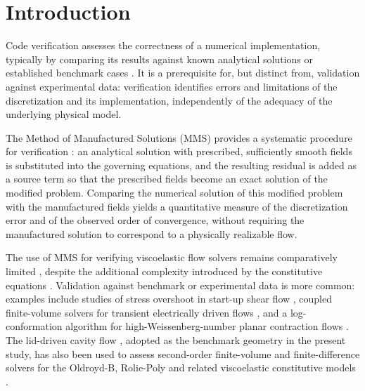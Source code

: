 \documentclass[preprint, 12pt]{elsarticle}
\begin{document}
\section{Introduction}
\label{sec:Introduction}

Code verification assesses the correctness of a numerical implementation, typically by comparing its results against known analytical solutions or established benchmark cases \cite{Khoshghalb2019, Tranquilli2022, Fernandes2018, Pedro2020}. It is a prerequisite for, but distinct from, validation against experimental data: verification identifies errors and limitations of the discretization and its implementation, independently of the adequacy of the underlying physical model.

The Method of Manufactured Solutions (MMS) provides a systematic procedure for verification \cite{Roy2004, Habla2016, Muralha2020, Freno2021}: an analytical solution with prescribed, sufficiently smooth fields is substituted into the governing equations, and the resulting residual is added as a source term so that the prescribed fields become an exact solution of the modified problem. Comparing the numerical solution of this modified problem with the manufactured fields yields a quantitative measure of the discretization error and of the observed order of convergence, without requiring the manufactured solution to correspond to a physically realizable flow.

The use of MMS for verifying viscoelastic flow solvers remains comparatively limited \cite{Garcia2022}, despite the additional complexity introduced by the constitutive equations \cite{Fernandes2017}. Validation against benchmark or experimental data is more common: examples include studies of stress overshoot in start-up shear flow \citep{Tseng2021}, coupled finite-volume solvers for transient electrically driven flows \citep{Pimenta2019}, and a log-conformation algorithm for high-Weissenberg-number planar contraction flows \citep{Fernandes2022}. The lid-driven cavity flow \citep{Shankar2000}, adopted as the benchmark geometry in the present study, has also been used to assess second-order finite-volume and finite-difference solvers for the Oldroyd-B, Rolie-Poly and related viscoelastic constitutive models \citep{Abuga2020, Fernandes2019, Tomio2020}.
\end{document}
